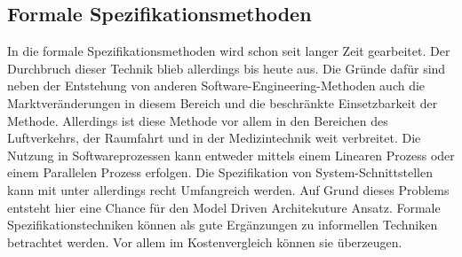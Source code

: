 \subsection{Formale Spezifikationsmethoden}
In die formale Spezifikationsmethoden wird schon seit langer Zeit gearbeitet. Der Durchbruch dieser Technik blieb allerdings bis heute aus. Die Gründe dafür sind neben der Entstehung von anderen Software-Engineering-Methoden auch die Marktveränderungen in diesem Bereich und die beschränkte Einsetzbarkeit der Methode. Allerdings ist diese Methode vor allem in den Bereichen des Luftverkehrs, der Raumfahrt und in der Medizintechnik weit verbreitet. Die Nutzung in Softwareprozessen kann entweder mittels einem Linearen Prozess oder einem Parallelen Prozess erfolgen. Die Spezifikation von System-Schnittstellen kann mit unter allerdings recht Umfangreich werden. Auf Grund dieses Problems entsteht hier eine Chance für den Model Driven Architekuture Ansatz.
\linebreak
Formale Spezifikationstechniken können als gute Ergänzungen zu informellen Techniken betrachtet werden. Vor allem im Kostenvergleich können sie überzeugen. 